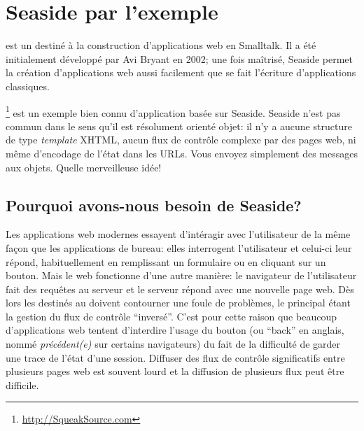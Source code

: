 \documentclass[a4paper,10pt,twoside]{book}
\begin{document}
	\renewcommand{\nnbb}[2]{} %
	\sloppy
\fi
\chapter{Seaside par l'exemple}


 est un \framework destiné à la construction
d'applications web en Smalltalk. 
Il a été initialement développé par Avi Bryant  
en 2002; 
une fois maîtrisé, Seaside permet la création d'applications
web aussi facilement que se fait l'écriture d'applications classiques.

\footnote{\url{http://SqueakSource.com}} est un exemple bien connu d'application basée sur Seaside.
Seaside n'est pas commun dans le sens qu'il est résolument orienté
objet: il n'y a aucune structure de type \emph{template} XHTML, aucun
flux de contrôle complexe par des pages web, ni même d'encodage de
l'état dans les URLs. Vous envoyez simplement des messages aux
objets. Quelle merveilleuse idée!

\section{Pourquoi avons-nous besoin de Seaside?}

Les applications web modernes essayent d'intéragir avec l'utilisateur
de la même façon que les applications de bureau: elles interrogent
l'utilisateur et celui-ci leur répond, habituellement en remplissant
un formulaire ou en cliquant sur un bouton.
Mais le web fonctionne d'une autre manière: le navigateur de
l'utilisateur fait des requêtes au serveur et le serveur répond avec
une nouvelle page web.
Dès lors les \frameworks destinés au
 doivent contourner une foule de
problèmes, le principal étant la gestion du flux de contrôle ``inversé''.
C'est pour cette raison que beaucoup d'applications web tentent
d'interdire l'usage du bouton \backbtn (ou ``back'' en anglais, nommé
\emph{précédent(e)} sur certains navigateurs) du fait de la
difficulté de garder une trace de l'état d'une session.
Diffuser des flux de contrôle significatifs entre plusieurs pages web 
est souvent lourd et la diffusion de plusieurs flux peut être difficile.
\end{document}
